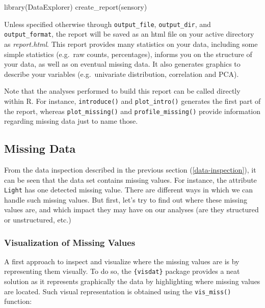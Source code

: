 \documentclass[
]{krantz}
\makeatletter
\newenvironment{Shaded}{\begin{snugshade}}{\end{snugshade}}
\newcommand{\FunctionTok}[1]{\textcolor[rgb]{0,0,0}{#1}}
\newcommand{\NormalTok}[1]{#1}
\renewenvironment{quote}{\begin{VF}}{\end{VF}}
\newenvironment{kframe}{%
\medskip{}
\setlength{\fboxsep}{.8em}
 \def\at@end@of@kframe{}%
 \ifinner\ifhmode%
  \def\at@end@of@kframe{\end{minipage}}%
  \begin{minipage}{\columnwidth}%
 \fi\fi%
 \def\FrameCommand##1{\hskip\@totalleftmargin \hskip-\fboxsep
 \colorbox{shadecolor}{##1}\hskip-\fboxsep
     \hskip-\linewidth \hskip-\@totalleftmargin \hskip\columnwidth}%
 \MakeFramed {\advance\hsize-\width
   \@totalleftmargin\z@ \linewidth\hsize
   \@setminipage}}%
 {\par\unskip\endMakeFramed%
 \at@end@of@kframe}
\renewenvironment{Shaded}{\begin{kframe}}{\end{kframe}}
\makeatother
\begin{document}
\begin{Shaded}
\begin{Highlighting}[]
\FunctionTok{library}\NormalTok{(DataExplorer)}
\FunctionTok{create\_report}\NormalTok{(sensory)}
\end{Highlighting}
\end{Shaded}

Unless specified otherwise through \texttt{output\_file}, \texttt{output\_dir}, and \texttt{output\_format}, the report will be saved as an html file on your active directory as \emph{report.html}. This report provides many statistics on your data, including some simple statistics (e.g.~raw counts, percentages), informs you on the structure of your data, as well as on eventual missing data. It also generates graphics to describe your variables (e.g.~univariate distribution, correlation and PCA).

\begin{quote}
Note that the analyses performed to build this report can be called directly within R. For instance, \texttt{introduce()} and \texttt{plot\_intro()} generates the first part of the report, whereas \texttt{plot\_missing()} and \texttt{profile\_missing()} provide information regarding missing data just to name those.
\end{quote}

\hypertarget{missing-data}{%
\subsection{Missing Data}\label{missing-data}}

From the data inspection described in the previous section (\ref{data-inspection}), it can be seen that the data set contains missing values. For instance, the attribute \texttt{Light} has one detected missing value. There are different ways in which we can handle such missing values. But first, let's try to find out where these missing values are, and which impact they may have on our analyses (are they structured or unstructured, etc.)

\hypertarget{visualization-of-missing-values}{%
\subsubsection*{Visualization of Missing Values}\label{visualization-of-missing-values}}


A first approach to inspect and visualize where the missing values are is by representing them visually. To do so, the \texttt{\{visdat\}} package provides a neat solution as it represents graphically the data by highlighting where missing values are located. Such visual representation is obtained using the \texttt{vis\_miss()} function:
\end{document}
